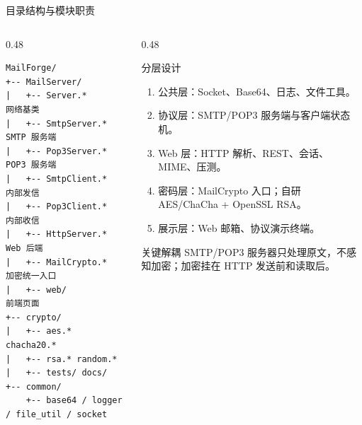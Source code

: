 \documentclass[aspectratio=169,10pt]{beamer}
\begin{document}
\begin{frame}[fragile]{目录结构与模块职责}
  \begin{columns}[T]
    \begin{column}{0.48\textwidth}
      \begin{lstlisting}[style=protostyle,basicstyle=\ttfamily\tiny]
MailForge/
+-- MailServer/
|   +-- Server.*       网络基类
|   +-- SmtpServer.*   SMTP 服务端
|   +-- Pop3Server.*   POP3 服务端
|   +-- SmtpClient.*   内部发信
|   +-- Pop3Client.*   内部收信
|   +-- HttpServer.*   Web 后端
|   +-- MailCrypto.*   加密统一入口
|   +-- web/           前端页面
+-- crypto/
|   +-- aes.* chacha20.*
|   +-- rsa.* random.*
|   +-- tests/ docs/
+-- common/
    +-- base64 / logger / file_util / socket
      \end{lstlisting}
    \end{column}
    \begin{column}{0.48\textwidth}
      \begin{block}{分层设计}
        \small
        \begin{enumerate}
          \item 公共层：Socket、Base64、日志、文件工具。
          \item 协议层：SMTP/POP3 服务端与客户端状态机。
          \item Web 层：HTTP 解析、REST、会话、MIME、压测。
          \item 密码层：MailCrypto 入口；自研 AES/ChaCha + OpenSSL RSA。
          \item 展示层：Web 邮箱、协议演示终端。
        \end{enumerate}
      \end{block}
      \begin{block}{关键解耦}
        \small
        SMTP/POP3 服务器只处理原文，不感知加密；加密挂在 HTTP 发送前和读取后。
      \end{block}
    \end{column}
  \end{columns}
\end{frame}
\end{document}
